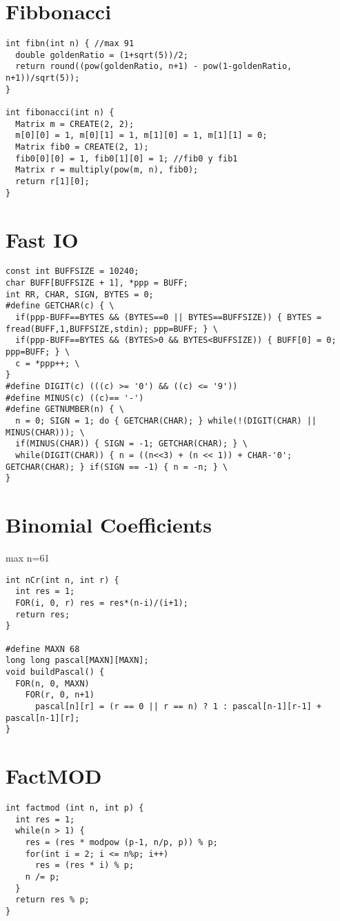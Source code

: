 \documentclass[11pt, oneside]{article}
\begin{document}
\section{Fibbonacci}
\begin{lstlisting}
int fibn(int n) { //max 91
  double goldenRatio = (1+sqrt(5))/2;
  return round((pow(goldenRatio, n+1) - pow(1-goldenRatio, n+1))/sqrt(5));
}

int fibonacci(int n) {
  Matrix m = CREATE(2, 2);
  m[0][0] = 1, m[0][1] = 1, m[1][0] = 1, m[1][1] = 0;
  Matrix fib0 = CREATE(2, 1);
  fib0[0][0] = 1, fib0[1][0] = 1; //fib0 y fib1
  Matrix r = multiply(pow(m, n), fib0);
  return r[1][0];
}

\end{lstlisting}
\section{Fast IO}
\begin{lstlisting}
const int BUFFSIZE = 10240;
char BUFF[BUFFSIZE + 1], *ppp = BUFF;
int RR, CHAR, SIGN, BYTES = 0;
#define GETCHAR(c) { \
  if(ppp-BUFF==BYTES && (BYTES==0 || BYTES==BUFFSIZE)) { BYTES = fread(BUFF,1,BUFFSIZE,stdin); ppp=BUFF; } \
  if(ppp-BUFF==BYTES && (BYTES>0 && BYTES<BUFFSIZE)) { BUFF[0] = 0; ppp=BUFF; } \
  c = *ppp++; \
}
#define DIGIT(c) (((c) >= '0') && ((c) <= '9'))
#define MINUS(c) ((c)== '-')
#define GETNUMBER(n) { \
  n = 0; SIGN = 1; do { GETCHAR(CHAR); } while(!(DIGIT(CHAR) || MINUS(CHAR))); \
  if(MINUS(CHAR)) { SIGN = -1; GETCHAR(CHAR); } \
  while(DIGIT(CHAR)) { n = ((n<<3) + (n << 1)) + CHAR-'0'; GETCHAR(CHAR); } if(SIGN == -1) { n = -n; } \
}

\end{lstlisting}
\section{Binomial Coefficients}
max n=61
\begin{lstlisting}
int nCr(int n, int r) {
  int res = 1;
  FOR(i, 0, r) res = res*(n-i)/(i+1);
  return res;
}

#define MAXN 68
long long pascal[MAXN][MAXN];
void buildPascal() {
  FOR(n, 0, MAXN)
    FOR(r, 0, n+1)
      pascal[n][r] = (r == 0 || r == n) ? 1 : pascal[n-1][r-1] + pascal[n-1][r];
}

\end{lstlisting}
\section{FactMOD}
\begin{lstlisting}
int factmod (int n, int p) {
  int res = 1;
  while(n > 1) {
    res = (res * modpow (p-1, n/p, p)) % p;
    for(int i = 2; i <= n%p; i++)
      res = (res * i) % p;
    n /= p;
  }
  return res % p;
}

\end{lstlisting}
\end{document}

